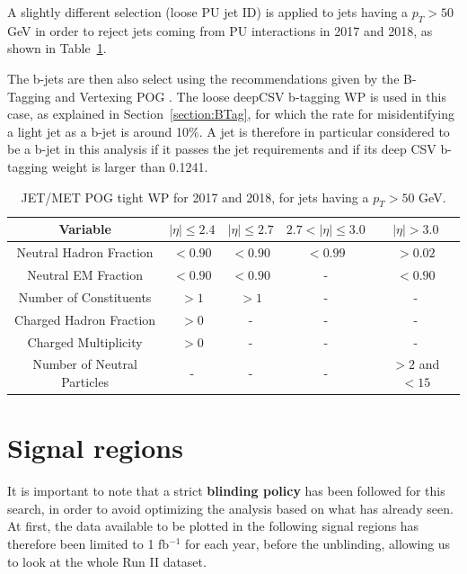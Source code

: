\documentclass[a4paper, 10pt, openright]{report}
\begin{document}
A slightly different selection (loose \ac{PU} jet ID) is applied to jets having a $p_T > 50$ GeV in order to reject jets coming from \ac{PU} interactions in 2017 and 2018, as shown in Table~\ref{table:JetSelPU}.

The b-jets are then also select using the recommendations given by the B-Tagging and Vertexing \ac{POG} \cite{BTagPOG}. The loose deepCSV b-tagging \ac{WP} is used in this case, as explained in Section~\ref{section:BTag}, for which the rate for misidentifying a light jet as a b-jet is around 10\%. A jet is therefore in particular considered to be a b-jet in this analysis if it passes the jet requirements and if its deep CSV b-tagging weight is larger than 0.1241.

\begin{table}
\begin{center}
\begin{tabular}{ c|c|c|c|c } 
 \hline
 Variable & $|\eta| \leq 2.4$ & $|\eta| \leq 2.7$ & $2.7 < |\eta| \leq 3.0$ & $|\eta| > 3.0$ \\
\hline
Neutral Hadron Fraction & $< 0.90$ & $< 0.90$ & $< 0.99$ & $> 0.02$ \\
Neutral EM Fraction & $< 0.90$ & $< 0.90$ & - & $< 0.90$ \\
Number of Constituents & $> 1$ & $> 1$ & - & - \\
Charged Hadron Fraction & $> 0$ & - & - & - \\
Charged Multiplicity & $> 0$ & - & - & - \\
Number of Neutral Particles & - & - & - & $> 2$ and $< 15$ \\
\hline
\end{tabular}
\caption{JET/MET \ac{POG} tight \ac{WP} for 2017 and 2018, for jets having a $p_T > 50$ GeV.}
\label{table:JetSelPU}
\end{center}
\end{table}

\section{Signal regions} \label{section:SR}

It is important to note that a strict \textbf{blinding policy} has been followed for this search, in order to avoid optimizing the analysis based on what has already seen. At first, the data available to be plotted in the following signal regions has therefore been limited to 1 fb$^{-1}$ for each year, before the unblinding, allowing us to look at the whole Run II dataset.
\end{document}
